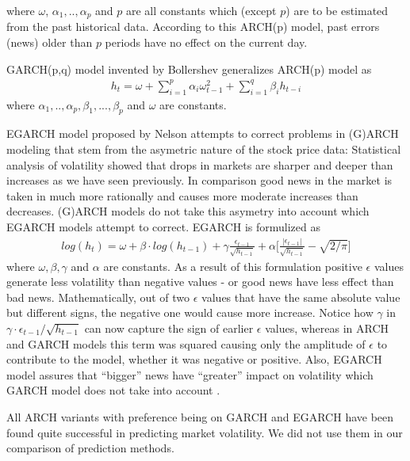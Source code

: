 where $\omega$, $\alpha_1,..,\alpha_p$ and $p$ are all constants which (except
$p$) are to be estimated from the past historical data. According to this
ARCH(p) model, past errors (news) older than $p$ periods have no effect on the
current day.

GARCH(p,q) model invented by Bollershev \cite{bollershev} generalizes ARCH(p)
model as
\begin{eqnarray*}
h_t = \omega + \sum_{i=1}^p \alpha_i \omega_{t-1}^2 + \sum_{i=1}^q \beta_i h_{t-i}
\end{eqnarray*}
where $\alpha_1,..,\alpha_p,\beta_1,...,\beta_p$ and $\omega$ are constants. 

EGARCH model proposed by Nelson \cite{nelson} attempts to correct problems in
(G)ARCH modeling that stem from the asymetric nature of the stock price data:
Statistical analysis of volatility showed that drops in markets are sharper and
deeper than increases as we have seen previously. In comparison good news in the
market is taken in much more rationally and causes more moderate increases than
decreases. (G)ARCH models do not take this asymetry into account which EGARCH
models attempt to correct. EGARCH is formulized as
\begin{eqnarray*}
log(h_t) = \omega + \beta \cdot log(h_{t-1}) + 
\gamma \frac{\epsilon_{t-1}}{\sqrt{h_{t-1}}} + 
\alpha \bigg[ \frac{|\epsilon_{t-1}|}{\sqrt{h_{t-1}}} - \sqrt{2 / \pi} \bigg]
\end{eqnarray*}
where $\omega,\beta,\gamma$ and $\alpha$ are constants. As a result of this
formulation positive $\epsilon$ values generate less volatility than negative
values - or good news have less effect than bad news. Mathematically, out of two
$\epsilon$ values that have the same absolute value but different signs, the
negative one would cause more increase. Notice how $\gamma$ in $\gamma \cdot
\epsilon_{t-1} / \sqrt{h_{t-1}}$ can now capture the sign of earlier $\epsilon$
values, whereas in ARCH and GARCH models this term was squared causing only the
amplitude of $\epsilon$ to contribute to the model, whether it was negative or
positive. Also, EGARCH model assures that ``bigger'' news have ``greater''
impact on volatility which GARCH model does not take into account \cite{engle2}.

All ARCH variants with preference being on GARCH and EGARCH have been found
quite successful in predicting market volatility. We did not use them in our
comparison of prediction methods. 

